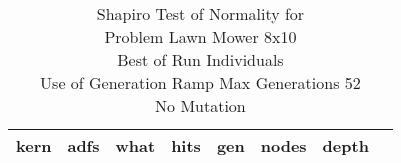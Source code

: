 \begin{table}[H]
\caption{Shapiro Test of Normality for \\ Problem  Lawn Mower 8x10\\Best of Run Individuals \\ Use of Generation Ramp  Max Generations 52\\ No Mutation \\}
\begin{center}
\scalebox{0.8} %
{
\begin{tabular}{lrrrrrrr}
\hline
kern & adfs & what & hits & gen & nodes & depth \\
\hline


\end{tabular}
}
\end{center}
\end{table}

